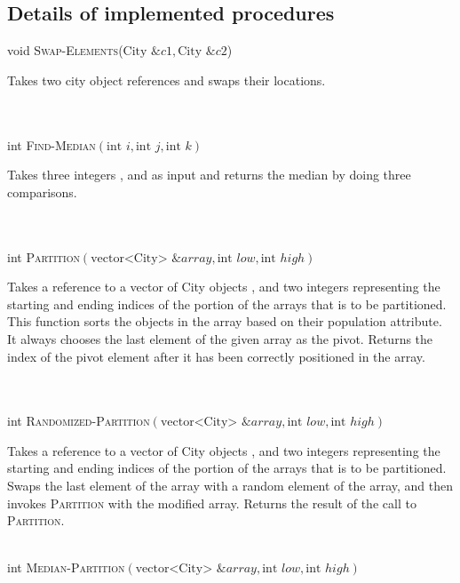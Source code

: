 \subsection{Details of implemented procedures}
\label{details-of-procs}
\noindent void \textsc{Swap-Elements}($\text{City \&}c1, \text{City \&}c2$)\\
\begin{indent}
    Takes two city object references and swaps their locations.
\end{indent}
\\
\\
\noindent int \textsc{Find-Median}$(\text{int }i, \text{int }j, \text{int }k)$\\
\begin{indent}
    Takes three integers ,  and  as input and returns the median by doing three comparisons.
\end{indent}
\\
\\
\noindent int \textsc{Partition}$(\text{vector<City> \&} array, \text{int } low, \text{int }high)$\\
\begin{indent}
    Takes a reference to a vector of City objects , and two integers representing the starting  and ending  indices of the portion of the arrays that is to be partitioned. This function sorts the objects in the array based on their population attribute. It always chooses the last element of the given array as the pivot. Returns the index of the pivot element after it has been correctly positioned in the array.
\end{indent}
\\
\\
\noindent int \textsc{Randomized-Partition}$(\text{vector<City> \&} array, \text{int } low, \text{int }high)$\\
\begin{indent}
    Takes a reference to a vector of City objects , and two integers representing the starting  and ending  indices of the portion of the arrays that is to be partitioned. Swaps the last element of the array with a random element of the array, and then invokes \textsc{Partition} with the modified array. Returns the result of the call to \textsc{Partition}.
\end{indent}
\\
\noindent int \textsc{Median-Partition}$(\text{vector<City> \&} array, \text{int } low, \text{int }high)$\\
